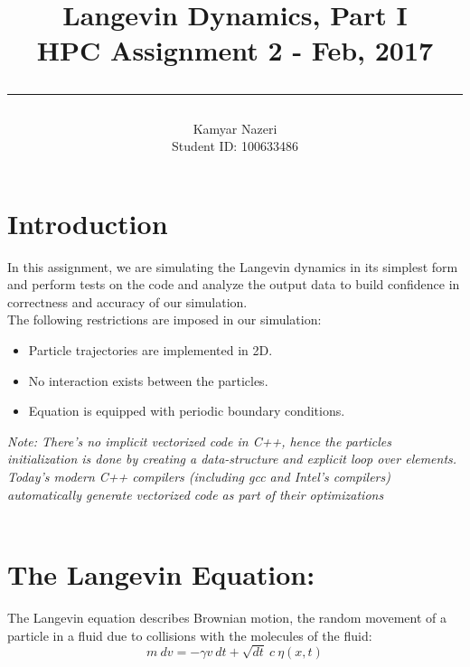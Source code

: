 \documentclass[a4paper,11pt]{article}
\begin{document}
\title{
	\Huge \textbf {Langevin Dynamics, Part I}
    \\ [0.2cm]
	\LARGE HPC Assignment 2 - Feb, 2017
    \\ [0.5cm]
    \hrule
}

\date{}

\author{
		\Large Kamyar Nazeri \\
		\large Student ID: 100633486 }

\maketitle
\newpage

\section*{Introduction}
In this assignment, we are simulating the Langevin dynamics in its simplest form and perform tests on the code and analyze the output data to build confidence in correctness and accuracy of our simulation. \\
The following restrictions are imposed in our simulation:
\begin{itemize}
  \item Particle trajectories are implemented in 2D.
  \item No interaction exists between the particles.
  \item Equation is equipped with periodic boundary conditions.
\end{itemize}
\textit{Note: There’s no implicit vectorized code in C++, hence the particles initialization is done by creating a data-structure and explicit loop over elements. Today's modern C++ compilers (including gcc and Intel's compilers) automatically generate vectorized code as part of their optimizations\cite{vectorization}} \\\\
\section*{The Langevin Equation:}
The Langevin equation describes Brownian motion, the random movement of a particle in a fluid due to collisions with the molecules of the fluid:
\begin{equation*}
  m\ dv = -\gamma v\ dt + \sqrt{dt}\ c\ \eta(x,t)
\end{equation*}
\end{document}
